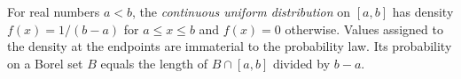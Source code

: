 
For real numbers $a<b$, the \emph{continuous uniform distribution} on $[a,b]$ has density $f(x)=1/(b-a)$ for $a\le x\le b$ and $f(x)=0$ otherwise. Values assigned to the density at the endpoints are immaterial to the probability law. Its probability on a Borel set $B$ equals the length of $B\cap[a,b]$ divided by $b-a$.
